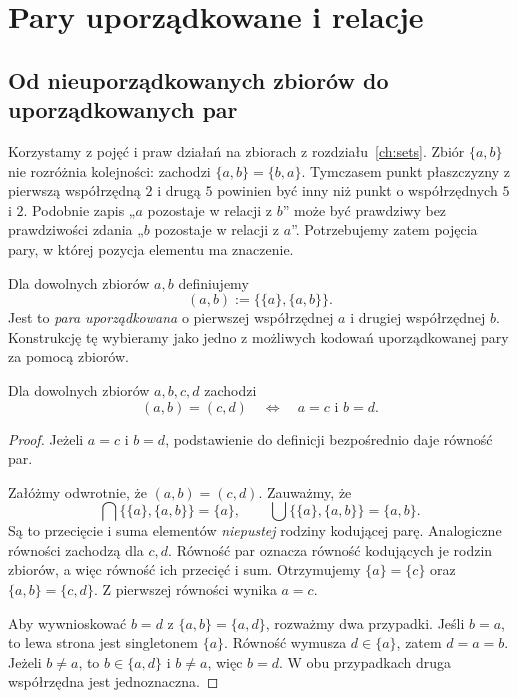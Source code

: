 \chapter{Pary uporządkowane i relacje}\label{ch:relations}

\section{Od nieuporządkowanych zbiorów do uporządkowanych par}
Korzystamy z pojęć i praw działań na zbiorach
z rozdziału~\ref{ch:sets}. Zbiór $\{a,b\}$ nie rozróżnia kolejności: zachodzi
$\{a,b\}=\{b,a\}$. Tymczasem punkt płaszczyzny z pierwszą
współrzędną $2$ i drugą $5$ powinien być inny niż punkt o
współrzędnych $5$ i $2$. Podobnie zapis „$a$ pozostaje w relacji z
$b$” może być prawdziwy bez prawdziwości zdania
„$b$ pozostaje w relacji z $a$”. Potrzebujemy zatem pojęcia pary,
w której pozycja elementu ma znaczenie.

\begin{definicja}
\label{def:kuratowski-pair}
Dla dowolnych zbiorów $a,b$ definiujemy
\[
(a,b):=\bigl\{\{a\},\{a,b\}\bigr\}.
\]
Jest to \emph{para uporządkowana} o pierwszej współrzędnej $a$
i drugiej współrzędnej $b$. Konstrukcję tę wybieramy jako
jedno z możliwych kodowań uporządkowanej pary za pomocą zbiorów.
\end{definicja}

\begin{twierdzenie}
\label{thm:kuratowski}
Dla dowolnych zbiorów $a,b,c,d$ zachodzi
\[
(a,b)=(c,d)\quad\Longleftrightarrow\quad a=c\text{ i }b=d.
\]
\end{twierdzenie}
\begin{proof}
Jeżeli $a=c$ i $b=d$, podstawienie do definicji
bezpośrednio daje równość par.

Załóżmy odwrotnie, że $(a,b)=(c,d)$. Zauważmy, że
\[
\bigcap\{\{a\},\{a,b\}\}=\{a\},\qquad
\bigcup\{\{a\},\{a,b\}\}=\{a,b\}.
\]
Są to przecięcie i suma elementów \emph{niepustej} rodziny
kodującej parę. Analogiczne równości zachodzą dla $c,d$.
Równość par oznacza równość kodujących je rodzin zbiorów,
a więc równość ich przecięć i sum. Otrzymujemy
$\{a\}=\{c\}$ oraz $\{a,b\}=\{c,d\}$.
Z pierwszej równości wynika $a=c$.

Aby wywnioskować $b=d$ z $\{a,b\}=\{a,d\}$,
rozważmy dwa przypadki. Jeśli $b=a$, to lewa strona
jest singletonem $\{a\}$. Równość wymusza
$d\in\{a\}$, zatem $d=a=b$. Jeżeli $b\ne a$,
to $b\in\{a,d\}$ i $b\ne a$, więc $b=d$.
W obu przypadkach druga współrzędna jest jednoznaczna.
\end{proof}

